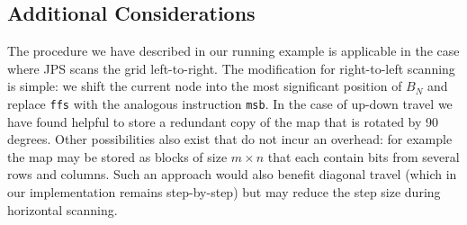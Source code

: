 \subsection{Additional Considerations}
The procedure we have described in our running example is applicable in the case
where JPS scans the grid left-to-right. The modification for right-to-left
scanning is simple: we shift the current node into the most significant position
of $B_N$ and replace \texttt{ffs} with the analogous instruction \texttt{msb}.  In the case
of up-down travel we have found helpful to store a redundant copy of the
map that is rotated by 90 degrees. Other possibilities also exist that do not
incur an overhead: for example the map may be stored as blocks of size $m
\times n$ that each contain bits from several rows and columns. Such an
approach would also benefit diagonal travel (which in our implementation
remains step-by-step) but may reduce the step size during horizontal scanning.
%
%
%
%
%

